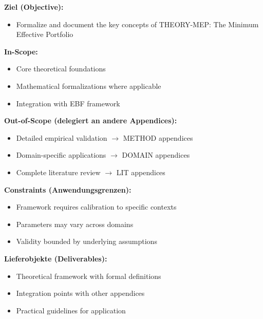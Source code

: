 \begin{tcolorbox}[
    colback=orange!5!white,
    colframe=orange!75!black,
    title={\textbf{Appendix Scope: Ziel / In-Scope / Out-of-Scope / Constraints}},
    fonttitle=\bfseries
]

\textbf{Ziel (Objective):}
\begin{itemize}[nosep]
    \item Formalize and document the key concepts of THEORY-MEP: The Minimum Effective Portfolio
\end{itemize}

\textbf{In-Scope:}
\begin{itemize}[nosep]
    \item Core theoretical foundations
    \item Mathematical formalizations where applicable
    \item Integration with EBF framework
\end{itemize}

\textbf{Out-of-Scope (delegiert an andere Appendices):}
\begin{itemize}[nosep]
    \item Detailed empirical validation $\rightarrow$ METHOD appendices
    \item Domain-specific applications $\rightarrow$ DOMAIN appendices
    \item Complete literature review $\rightarrow$ LIT appendices
\end{itemize}

\textbf{Constraints (Anwendungsgrenzen):}
\begin{itemize}[nosep]
    \item Framework requires calibration to specific contexts
    \item Parameters may vary across domains
    \item Validity bounded by underlying assumptions
\end{itemize}

\textbf{Lieferobjekte (Deliverables):}
\begin{itemize}[nosep]
    \item Theoretical framework with formal definitions
    \item Integration points with other appendices
    \item Practical guidelines for application
\end{itemize}

\end{tcolorbox}

